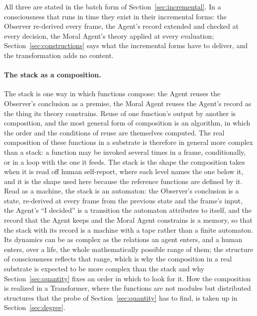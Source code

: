 All three are stated in the batch form of Section~\ref{sec:incremental}. In a consciousness that
runs in time they exist in their incremental forms: the Observer re-derived every frame, the Agent's
record extended and checked at every decision, the Moral Agent's theory applied at every evaluation;
Section~\ref{sec:constructions} says what the incremental forms have to deliver, and the
transformation adds no content.

\paragraph{The stack as a composition.}
The stack is one way in which functions compose: the Agent reuses the Observer's conclusion as a
premise, the Moral Agent reuses the Agent's record as the thing its theory constrains. Reuse of one
function's output by another is composition, and the most general form of composition is an
algorithm, in which the order and the conditions of reuse are themselves computed. The real
composition of these functions in a substrate is therefore in general more complex than a stack: a
function may be invoked several times in a frame, conditionally, or in a loop with the one it feeds.
The stack is the shape the composition takes when it is read off human self-report, where each level
names the one below it, and it is the shape used here because the reference functions are defined by
it. Read as a machine, the stack is an automaton: the Observer's conclusion is a state, re-derived at
every frame from the previous state and the frame's input, the Agent's ``I decided'' is a transition
the automaton attributes to itself, and the record that the Agent keeps and the Moral Agent constrains
is a memory, so that the stack with its record is a machine with a tape rather than a finite
automaton. Its dynamics can be as complex as the relations an agent enters, and a human enters, over a
life, the whole mathematically possible range of them; the structure of consciousness reflects that
range, which is why the composition in a real substrate is expected to be more complex than the stack
and why Section~\ref{sec:quantity} fixes an order in which to look for it. How the composition is realized in a Transformer, where the functions are not modules but
distributed structures that the probe of Section~\ref{sec:quantity} has to find, is taken up in
Section~\ref{sec:degree}.

